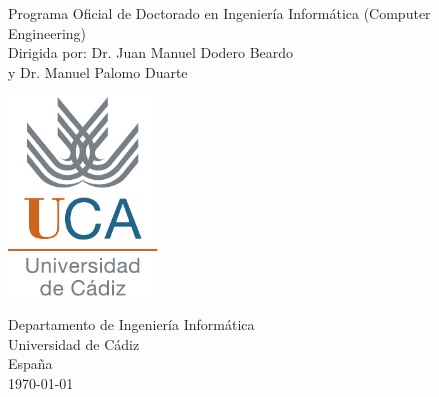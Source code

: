 \begin{titlepage}
\begin{center}
    \vspace*{1cm}
    
    \Huge
    \textbf{\thetitle}
    
    
    \vspace{1.5cm}
    
    \Large
    \textbf{\theauthor}
    
    \vfill
    
    Programa Oficial de Doctorado en Ingeniería Informática (Computer Engineering) \\
    Dirigida por: Dr. Juan Manuel Dodero Beardo \\
              y Dr. Manuel Palomo Duarte
    
    \vspace{0.8cm}
    \includegraphics[width=0.3\textwidth]{images/uca-logo.pdf}
    
    \vspace{0.5cm}
    
    \large
    Departamento de Ingeniería Informática \\
    Universidad de Cádiz \\
    España \\
    \today
    
\end{center}
\end{titlepage}